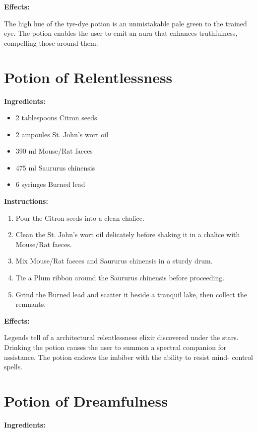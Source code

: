 \documentclass{article}
\begin{document}
\textbf{Effects:}

The high hue of the tye-dye potion is an unmistakable pale green to the trained eye. The potion enables the user to emit an aura that enhances truthfulness, compelling those around them.

\newpage
\section*{Potion of Relentlessness}

\textbf{Ingredients:}

\begin{itemize}
  \item 2 tablespoons Citron seeds
  \item 2 ampoules St. John's wort oil
  \item 390 ml Mouse/Rat faeces
  \item 475 ml Saururus chinensis
  \item 6 syringes Burned lead
\end{itemize}

\textbf{Instructions:}

\begin{enumerate}
  \item Pour the Citron seeds into a clean chalice.
  \item Clean the St. John's wort oil delicately before shaking it in a chalice with Mouse/Rat faeces.
  \item Mix Mouse/Rat faeces and Saururus chinensis in a sturdy drum.
  \item Tie a Plum ribbon around the Saururus chinensis before proceeding.
  \item Grind the Burned lead and scatter it beside a tranquil lake, then collect the remnants.
\end{enumerate}

\textbf{Effects:}

Legends tell of a architectural relentlessness elixir discovered under the stars. Drinking the potion causes the user to summon a spectral companion for assistance. The potion endows the imbiber with the ability to resist mind- control spells.

\newpage
\section*{Potion of Dreamfulness}

\textbf{Ingredients:}
\end{document}

